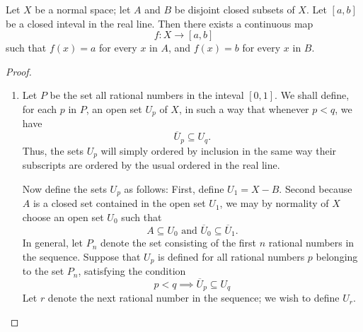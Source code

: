 \begin{theorem}
  Let \( X \) be a normal space;
  let \( A \) and \( B \) be disjoint closed subsets of \( X \).
  Let \( [a, b] \) be a closed inteval in the real line.
  Then there exists a continuous map
  \[
    f: X \to [a, b]
  \]
  such that \( f(x) = a \) for every \( x \) in \( A \), and \( f(x) = b \) for every \( x \) in \( B \).
\end{theorem}
\begin{proof}
  \begin{enumerate}
    \item Let \( P \) be the set all rational numbers in the inteval \( [0, 1] \).
      We shall define, for each \( p \) in \( P \), an open set \( U_p \) of \( X \), in such a way that whenever \( p < q \), we have
      \[
        \overline{U}_p \subseteq U_q.
      \]
      Thus, the sets \( U_p \) will simply ordered by inclusion in the same way their subscripts are ordered by the usual ordered in the real line.

      Now define the sets \( U_p \) as follows: First, define \( U_1 = X - B \).
      Second because \( A \) is a closed set contained in the open set \( U_1 \), we may by normality of \( X \) choose an open set \( U_0 \) such that
      \[
        A \subseteq U_0 \text{ and } \overline{U}_0 \subseteq \overline{U}_1.
      \]
      In general, let \( P_n \) denote the set consisting of the first \( n \) rational numbers in the sequence.
      Suppose that \( U_p \) is defined for all rational numbers \( p \) belonging to the set \( P_n \), satisfying the condition
      \begin{equation}
        p < q \implies \overline{U}_p \subseteq U_q \tag{*}\label{eq: Urysohn lemma construction}
      \end{equation}
      Let \( r \) denote the next rational number in the sequence; we wish to define \( U_r \).


\end{enumerate}
\end{proof}
